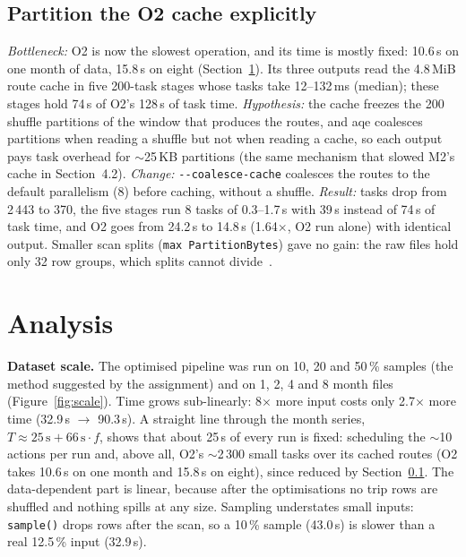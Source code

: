\documentclass[sigconf]{acmart}
\begin{document}
\subsection{Partition the O2 cache explicitly}
\label{sec:coalesce} \emph{Bottleneck:} O2 is now the slowest operation, and its
time is mostly fixed: 10.6\,s on one month of data, 15.8\,s on eight (Section~\ref{sec:analysis}).
Its three outputs read the 4.8\,MiB route cache in five 200-task stages whose
tasks take 12--132\,ms (median); these stages hold 74\,s of O2's 128\,s of
task time. \emph{Hypothesis:} the cache freezes the 200 shuffle partitions of
the window that produces the routes, and \gls{aqe} coalesces partitions when
reading a shuffle but not when reading a cache, so each output pays task overhead
for $\sim$25\,KB partitions (the same mechanism that slowed M2's cache in Section~4.2).
\emph{Change:} \texttt{-{}-coalesce-cache} coalesces the routes to the default
parallelism (8) before caching, without a shuffle. \emph{Result:} tasks drop
from 2\,443 to 370, the five stages run 8 tasks of 0.3--1.7\,s with 39\,s
instead of 74\,s of task time, and O2 goes from 24.2\,s to 14.8\,s (1.64$\times$,
O2 run alone) with identical output. Smaller scan splits (\texttt{max\allowbreak
      Partition\allowbreak Bytes}) gave no gain: the raw files hold only 32 row
groups, which splits cannot divide~\cite{parquet-format,spark-parquet}.

\section{Analysis}
\label{sec:analysis}

\textbf{Dataset scale.} The optimised pipeline was run on 10, 20 and 50\,\% samples
(the method suggested by the assignment) and on 1, 2, 4 and 8 month files (Figure~\ref{fig:scale}).
Time grows sub-linearly: 8$\times$ more input costs only 2.7$\times$ more time
(32.9\,s $\to$ 90.3\,s). A straight line through the month series, $T \approx 2
      5\,\mathrm{s}+ 66\,\mathrm{s}\cdot f$, shows that about 25\,s of every run is
fixed: scheduling the $\sim$10 actions per run and, above all, O2's $\sim$2\,300
small tasks over its cached routes (O2 takes 10.6\,s on one month and 15.8\,s
on eight), since reduced by Section~\ref{sec:coalesce}. The data-dependent part
is linear, because after the optimisations no trip rows are shuffled and
nothing spills at any size. Sampling understates small inputs: \texttt{sample()}
drops rows after the scan, so a 10\,\% sample (43.0\,s) is slower than a real
12.5\,\% input (32.9\,s).
\end{document}

